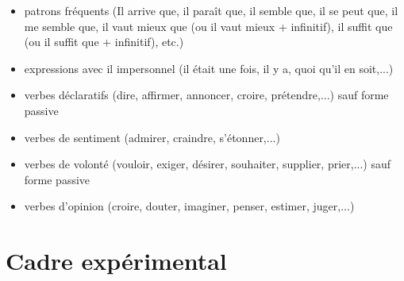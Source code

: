 \documentclass[a4paper,12pt]{article}
\begin{document}
\begin{itemize}
\begin{itemize}
  \item patrons fréquents (Il arrive que, il paraît que, il semble que, il se peut que, il me semble que, il vaut mieux que (ou il vaut mieux + infinitif), il suffit que (ou il suffit que + infinitif), etc.)
  \item expressions avec il impersonnel (il était une fois, il y a, quoi qu'il en soit,...)
  \item verbes déclaratifs (dire, affirmer, annoncer, croire, prétendre,...) sauf forme passive
  \item verbes de sentiment (admirer, craindre, s'étonner,...)
  \item verbes de volonté (vouloir, exiger, désirer, souhaiter, supplier, prier,...) sauf forme passive
  \item verbes d'opinion (croire, douter, imaginer, penser, estimer, juger,...)
 \end{itemize}
\end{itemize}

% 
% 


\section{Cadre expérimental}
\end{document}
